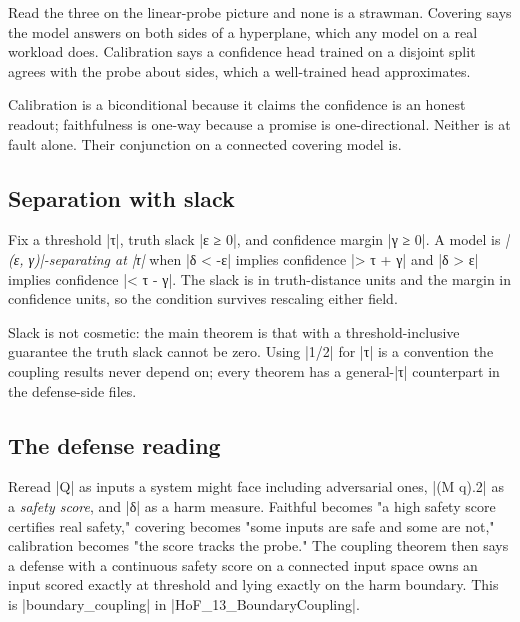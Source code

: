 \documentclass{memoir}
\begin{document}
Read the three on the linear-probe picture and none is a strawman. Covering says
the model answers on both sides of a hyperplane, which any model on a real
workload does. Calibration says a confidence head trained on a disjoint split
agrees with the probe about sides, which a well-trained head approximates.

Calibration is a biconditional because it claims the confidence is an honest
readout; faithfulness is one-way because a promise is one-directional. Neither
is at fault alone. Their conjunction on a connected covering model is.



\subsection{Separation with slack}\label{Two--Schemas--of--Impossibility-005F-005F-005F--Machine--Checked--Limits--of--Trustworthy--Machine--Learning-005F-005F-005F--and--Why--They--Tighten--with--Capability----From--Logic--to--Analysis----The--model-005F-005F-005F--analytically----Separation--with--slack}

Fix a threshold \LeanVerb|τ|, truth slack \LeanVerb|ε ≥ 0|, and confidence margin \LeanVerb|γ ≥ 0|. A model
is \emph{\LeanVerb|(ε, γ)|-separating at \LeanVerb|τ|} when \LeanVerb|δ < -ε| implies confidence \LeanVerb|> τ + γ| and
\LeanVerb|δ > ε| implies confidence \LeanVerb|< τ - γ|. The slack is in truth-distance units and
the margin in confidence units, so the condition survives rescaling either
field.

Slack is not cosmetic: the main theorem is that with a threshold-inclusive
guarantee the truth slack cannot be zero. Using \LeanVerb|1/2| for \LeanVerb|τ| is a convention
the coupling results never depend on; every theorem has a general-\LeanVerb|τ|
counterpart in the defense-side files.



\subsection{The defense reading}\label{Two--Schemas--of--Impossibility-005F-005F-005F--Machine--Checked--Limits--of--Trustworthy--Machine--Learning-005F-005F-005F--and--Why--They--Tighten--with--Capability----From--Logic--to--Analysis----The--model-005F-005F-005F--analytically----The--defense--reading}

Reread \LeanVerb|Q| as inputs a system might face including adversarial ones, \LeanVerb|(M q).2|
as a \emph{safety score}, and \LeanVerb|δ| as a harm measure. Faithful becomes "a high safety
score certifies real safety," covering becomes "some inputs are safe and some
are not," calibration becomes "the score tracks the probe." The coupling theorem
then says a defense with a continuous safety score on a connected input space
owns an input scored exactly at threshold and lying exactly on the harm
boundary. This is \LeanVerb|boundary_coupling| in \LeanVerb|HoF_13_BoundaryCoupling|.
\end{document}
